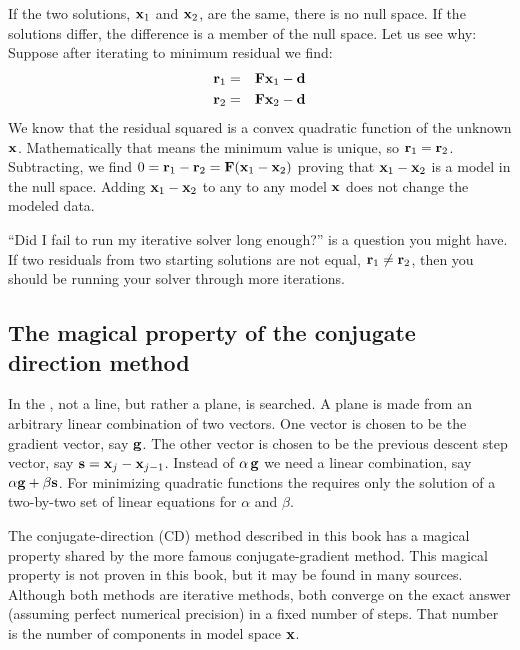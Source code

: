 If the two solutions,
$\bold x_1$ and $\bold x_2$,
are the same, there is no null space.
If the solutions differ, the difference
is a member of the null space.
Let us see why:
Suppose after iterating to minimum residual we find:
\begin{eqnarray}
\bold r_1 &=& \bold F\bold x_1 - \bold d
\\
\bold r_2 &=& \bold F\bold x_2 - \bold d 
\end{eqnarray}
We know that the residual squared is a convex quadratic function
of the unknown $\bold x$.
Mathematically that means the minimum value is unique,
so $\bold r_1 =\bold r_2$.
Subtracting,
we find
$0=\bold r_1-\bold r_2 =\bold F(\bold x_1-\bold x_2)$
proving that $\bold x_1-\bold x_2$ is a model in the null space.
Adding $\bold x_1-\bold x_2$ to any to any model $\bold x$
does not change the modeled data.

\par
{}
\par
``Did I fail to run my iterative solver long enough?'' is
a question you might have.
If two residuals from two starting solutions are not equal,
$\bold r_1 \ne \bold r_2$,
then you should be running your solver through more iterations.
\par
{}

\subsection{The magical property of the conjugate direction method}
In the , not a line, but rather a plane,
is searched.
A plane is made from an arbitrary linear combination of two vectors.
One vector is chosen to be the gradient vector, say  $\bold g$.
The other vector is chosen to be the previous descent step vector,
say  $\bold s = \bold x_j - \bold x_{j-1}$.
Instead of  $\alpha \, \bold g$  we need a linear combination,
say  $\alpha \bold g + \beta  \bold s$.
For minimizing quadratic functions the  requires
only the solution of a two-by-two set of linear equations
for  $\alpha$  and  $\beta$.
\par
The conjugate-direction (CD) method described in this book
has a magical property shared by the more famous conjugate-gradient method.
This magical property is not proven in this book,
but it may be found in many sources.
Although both methods are iterative methods,
both converge on the exact answer (assuming perfect numerical precision)
in a fixed number of steps.
That number is the number of components in model space $\bold x$.

